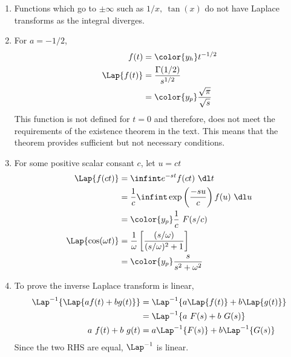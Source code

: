 \begin{enumerate}
    \item Functions which go to $ \pm \infty $ such as $ 1/x,\ \tan(x)$ do not have
          Laplace transforms as the integral diverges.

    \item For $ a = -1/2 $,
          \begin{align}
              f(t)         & = \color{y_h} t^{-1/2}                    \\
              \Lap\{f(t)\} & = \frac{\Gamma(1/2)}{s^{1/2}}             \\
                           & = \color{y_p} \frac{\sqrt{\pi}}{\sqrt{s}}
          \end{align}
          This function is not defined for $ t=0 $ and therefore, does not meet the
          requirements of the existence theorem in the text. This means that the
          theorem provides sufficient but not necessary conditions.

    \item For some positive scalar consant $ c $, let $ u = ct $
          \begin{align}
              \Lap\{f(ct)\}          & = \infint e^{-st}f(ct)\ \dl t               \\
                                     & = \frac{1}{c}\infint \exp
              \left( \frac{-su}{c} \right) f(u)\ \dl u                             \\
                                     & = \color{y_p}\frac{1}{c}\ F(s/c)            \\
              \Lap\{\cos(\omega t)\} & = \frac{1}{\omega} \left[ \frac{(s/\omega)}
              {(s/\omega)^2 + 1} \right]                                           \\
                                     & = \color{y_p} \frac{s}{s^2 + \omega^2}
          \end{align}

    \item To prove the inverse Laplace transform is linear,
          \begin{align}
              \Lap^{-1}\{\Lap\{af(t) + bg(t)\}\} & = \Lap^{-1}\{a \Lap\{f(t)\}
              + b \Lap\{g(t)\}\}                                                   \\
                                                 & =\Lap^{-1}\{a\ F(s) + b\ G(s)\} \\
              a\ f(t) + b\ g(t)                  & = a \Lap^{-1}\{F(s)\} +
              b \Lap^{-1}\{G(s)\}
          \end{align}
          Since the two RHS are equal, $ \Lap^{-1} $ is linear.


\end{enumerate}
